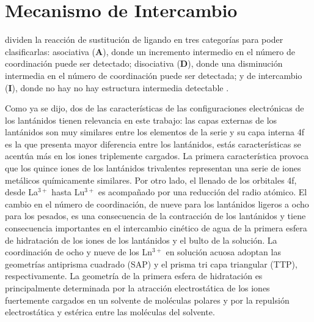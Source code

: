 \section{Mecanismo de Intercambio}
\cite{Helm2005} dividen la reacci\'on de sustituci\'on de ligando en 
tres categor\'ias para poder clasificarlas: asociativa ({\bf A}), 
donde un incremento intermedio en el n\'umero de coordinaci\'on puede
ser detectado; disociativa ({\bf D}), donde una disminuci\'on 
intermedia en el n\'umero de coordinaci\'on puede ser detectada; y de
intercambio ({\bf I}), donde no hay no hay estructura intermedia 
detectable \citep{Helm2005}. 

Como ya se dijo, dos de las caracter\'isticas de las configuraciones 
electr\'onicas de los lant\'anidos tienen relevancia en este trabajo:
las capas externas de los lant\'anidos son muy similares entre los 
elementos de la serie y su capa interna 4f es la que presenta mayor 
diferencia entre los lant\'anidos, est\'as caracter\'isticas se
acent\'ua m\'as en los iones triplemente cargados. La primera
caracter\'istica provoca que los quince iones de los lant\'anidos 
trivalentes representan una serie de iones met\'alicos qu\'imicamente 
similares. Por otro lado, el llenado de los orbitales 4f, desde 
La$^{3+}$ hasta Lu$^{3+}$ es acompa\~nado por una reducci\'on del 
radio at\'omico. El cambio en el n\'umero de coordinaci\'on, de nueve 
para los lant\'anidos ligeros a ocho para los pesados, es una 
consecuencia de la contracci\'on de los lant\'anidos y tiene 
consecuencia importantes en el intercambio cin\'etico de agua de la 
primera esfera de hidrataci\'on de los iones de los lant\'anidos y el 
bulto de la soluci\'on. La coordinaci\'on de ocho y nueve de los 
Ln$^{3+}$ en soluci\'on acuosa adoptan las geometr\'ias antiprisma 
cuadrado (SAP) y el prisma tri capa triangular (TTP), respectivamente.
La geometr\'ia de la primera esfera de hidrataci\'on es principalmente
determinada por la atracci\'on electrost\'atica de los iones 
fuertemente cargados en un solvente de mol\'eculas polares y por la 
repulsi\'on electrost\'atica y est\'erica entre las mol\'eculas del 
solvente. 

